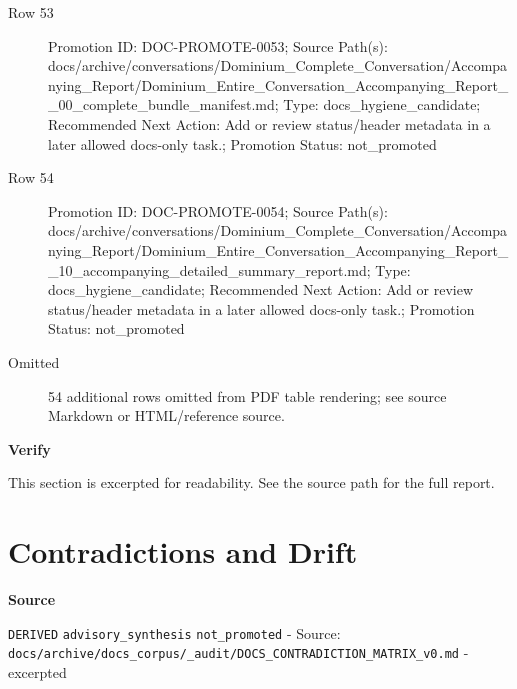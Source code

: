 \documentclass[10.5pt,a4paper,openany]{book}
\newcommand{\vonecallout}[3]{\par\medskip\noindent\begingroup\setlength{\fboxsep}{7pt}\colorbox{DomCalloutBg}{\parbox{0.94\linewidth}{\textbf{\textcolor{#1}{#2}}\par #3}}\endgroup\par\medskip}
\begin{document}
\begin{description}
\item[Row 53] Promotion ID: DOC-\allowbreak{}PROMOTE-\allowbreak{}0053; Source Path(s): docs/\allowbreak{}archive/\allowbreak{}conversations/\allowbreak{}Dominium\_\allowbreak{}Complete\_\allowbreak{}Conversation/\allowbreak{}Accompanying\_\allowbreak{}Report/\allowbreak{}Dominium\_\allowbreak{}Entire\_\allowbreak{}Conversation\_\allowbreak{}Accompanying\_\allowbreak{}Report\_\allowbreak{}\_\allowbreak{}00\_\allowbreak{}complete\_\allowbreak{}bundle\_\allowbreak{}manifest.\allowbreak{}md; Type: docs\_\allowbreak{}hygiene\_\allowbreak{}candidate; Recommended Next Action: Add or review status/\allowbreak{}header metadata in a later allowed docs-\allowbreak{}only task.\allowbreak{}; Promotion Status: not\_\allowbreak{}promoted
\item[Row 54] Promotion ID: DOC-\allowbreak{}PROMOTE-\allowbreak{}0054; Source Path(s): docs/\allowbreak{}archive/\allowbreak{}conversations/\allowbreak{}Dominium\_\allowbreak{}Complete\_\allowbreak{}Conversation/\allowbreak{}Accompanying\_\allowbreak{}Report/\allowbreak{}Dominium\_\allowbreak{}Entire\_\allowbreak{}Conversation\_\allowbreak{}Accompanying\_\allowbreak{}Report\_\allowbreak{}\_\allowbreak{}10\_\allowbreak{}accompanying\_\allowbreak{}detailed\_\allowbreak{}summary\_\allowbreak{}report.\allowbreak{}md; Type: docs\_\allowbreak{}hygiene\_\allowbreak{}candidate; Recommended Next Action: Add or review status/\allowbreak{}header metadata in a later allowed docs-\allowbreak{}only task.\allowbreak{}; Promotion Status: not\_\allowbreak{}promoted
\item[Omitted] 54 additional rows omitted from PDF table rendering; see source Markdown or HTML/\allowbreak{}reference source.\allowbreak{}
\end{description}

\vonecallout{DomAmber}{Verify}{This section is excerpted for readability.\allowbreak{} See the source path for the full report.\allowbreak{}}



\section{Contradictions and Drift}

\vonecallout{DomSlate}{Source}{\texttt{DERIVED} \texttt{advisory\_\allowbreak{}synthesis} \texttt{not\_\allowbreak{}promoted} -\allowbreak{} Source: \texttt{docs/\allowbreak{}archive/\allowbreak{}docs\_\allowbreak{}corpus/\allowbreak{}\_\allowbreak{}audit/\allowbreak{}DOCS\_\allowbreak{}CONTRADICTION\_\allowbreak{}MATRIX\_\allowbreak{}v0.\allowbreak{}md} -\allowbreak{} excerpted}
\end{document}

